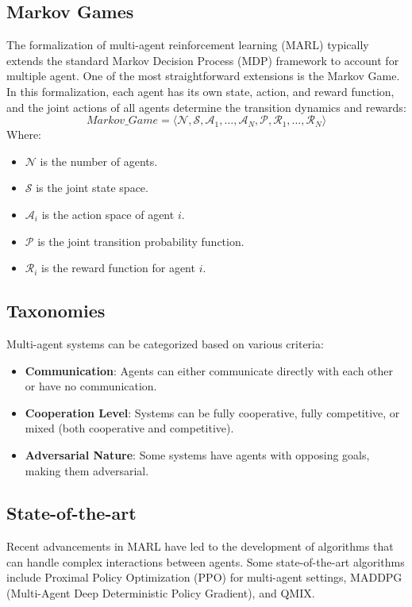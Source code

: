 \subsection{Markov Games}
The formalization of multi-agent reinforcement learning (MARL) typically extends the standard Markov Decision Process (MDP) framework to account for multiple agent. One of the most straightforward extensions is the Markov Game. 
 In this formalization, each agent has its own state, action, and reward function, and the joint actions of all agents determine the transition dynamics and rewards: 
\begin{equation}
Markov\_Game = \langle \mathcal{N}, \mathcal{S}, \mathcal{A}_1, \ldots, \mathcal{A}_N, \mathcal{P}, \mathcal{R}_1, \ldots, \mathcal{R}_N \rangle
\end{equation}
Where:
\begin{itemize}
    \item $\mathcal{N}$ is the number of agents.
    \item $\mathcal{S}$ is the joint state space.
    \item $\mathcal{A}_i$ is the action space of agent $i$.
    \item $\mathcal{P}$ is the joint transition probability function.
    \item $\mathcal{R}_i$ is the reward function for agent $i$.
\end{itemize}

\subsection{Taxonomies}
Multi-agent systems can be categorized based on various criteria:

\begin{itemize}
    \item \textbf{Communication}: Agents can either communicate directly with each other or have no communication.
    \item \textbf{Cooperation Level}: Systems can be fully cooperative, fully competitive, or mixed (both cooperative and competitive).
    \item \textbf{Adversarial Nature}: Some systems have agents with opposing goals, making them adversarial.
\end{itemize}

\subsection{State-of-the-art}
Recent advancements in MARL have led to the development of algorithms that can handle complex interactions between agents. Some state-of-the-art algorithms include Proximal Policy Optimization (PPO) for multi-agent settings, MADDPG (Multi-Agent Deep Deterministic Policy Gradient), and QMIX.

